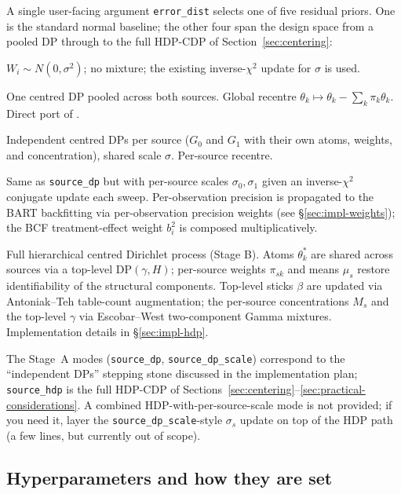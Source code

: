 \documentclass[11pt]{article}
\theoremstyle{plain}
\theoremstyle{definition}
\theoremstyle{remark}
\newcommand{\1}{\mathds{1}}
\begin{document}
A single user-facing argument \texttt{error\_dist} selects one of five residual priors. One is the standard normal baseline; the other four span the design space from a pooled DP through to the full HDP-CDP of Section~\ref{sec:centering}:
\begin{description}[noitemsep]
  \item[\texttt{gaussian}] $W_i \sim N(0, \sigma^2)$; no mixture; the existing inverse-$\chi^2$ update for $\sigma$ is used.
  \item[\texttt{shared\_dp}] One centred DP pooled across both sources. Global recentre $\theta_k \mapsto \theta_k - \sum_k \pi_k \theta_k$. Direct port of \citet{henderson2020individualized}.
  \item[\texttt{source\_dp}] Independent centred DPs per source ($G_0$ and $G_1$ with their own atoms, weights, and concentration), shared scale $\sigma$. Per-source recentre.
  \item[\texttt{source\_dp\_scale}] Same as \texttt{source\_dp} but with per-source scales $\sigma_0, \sigma_1$ given an inverse-$\chi^2$ conjugate update each sweep. Per-observation precision is propagated to the BART backfitting via per-observation precision weights (see \S\ref{sec:impl-weights}); the BCF treatment-effect weight $b_i^2$ is composed multiplicatively.
  \item[\texttt{source\_hdp}] Full hierarchical centred Dirichlet process (Stage B). Atoms $\theta^*_k$ are shared across sources via a top-level $\mathrm{DP}(\gamma, H)$; per-source weights $\pi_{sk}$ and means $\mu_s$ restore identifiability of the structural components. Top-level sticks $\beta$ are updated via Antoniak--Teh table-count augmentation; the per-source concentrations $M_s$ and the top-level $\gamma$ via Escobar--West two-component Gamma mixtures. Implementation details in \S\ref{sec:impl-hdp}.
\end{description}
The Stage~A modes (\texttt{source\_dp}, \texttt{source\_dp\_scale}) correspond to the ``independent DPs'' stepping stone discussed in the implementation plan; \texttt{source\_hdp} is the full HDP-CDP of Sections~\ref{sec:centering}--\ref{sec:practical-considerations}. A combined HDP-with-per-source-scale mode is not provided; if you need it, layer the \texttt{source\_dp\_scale}-style $\sigma_s$ update on top of the HDP path (a few lines, but currently out of scope).

\subsection{Hyperparameters and how they are set}\label{sec:impl-hyperparams}
\end{document}
